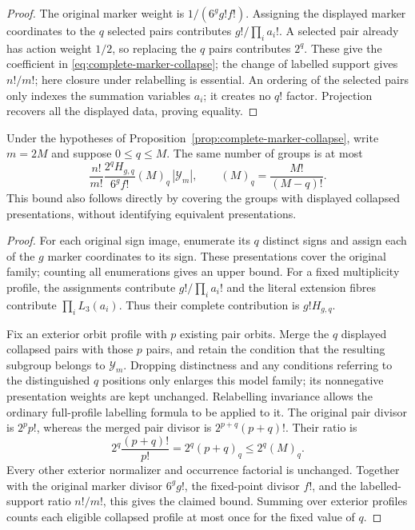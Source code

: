 \begin{proof}
The original marker weight is $1/(6^gg!f!)$. Assigning the displayed
marker coordinates to the $q$ selected pairs contributes
$g!/\prod_i a_i!$. A selected pair already has action weight $1/2$,
so replacing the $q$ pairs contributes $2^q$. These give the
coefficient in \eqref{eq:complete-marker-collapse}; the change of
labelled support gives $n!/m!$; here closure under relabelling is
essential. An ordering of the selected pairs only
indexes the summation variables $a_i$; it creates no $q!$ factor.
Projection recovers all the displayed data, proving equality.
\end{proof}

\begin{proposition}
\label{prop:marker-presentation-bound}
Under the hypotheses of Proposition~\ref{prop:complete-marker-collapse},
write $m=2M$ and suppose $0\leq q\leq M$. The same number of groups is
at most
\[
 \frac{n!}{m!}\frac{2^qH_{g,q}}{6^gf!}(M)_q\,|\mathcal Y_m|,
 \qquad (M)_q=\frac{M!}{(M-q)!}.
\]
This bound also follows directly by covering the groups with displayed
collapsed presentations, without identifying equivalent presentations.
\end{proposition}
\begin{proof}
For each original sign image, enumerate its $q$ distinct signs and assign
each of the $g$ marker coordinates to its sign. These presentations cover
the original family; counting all enumerations gives an upper bound.
For a fixed multiplicity profile, the assignments contribute
$g!/\prod_i a_i!$ and the literal extension fibres contribute
$\prod_iL_3(a_i)$. Thus their complete contribution is $g!H_{g,q}$.

Fix an exterior orbit profile with $p$ existing pair orbits. Merge the
$q$ displayed collapsed pairs with those $p$ pairs, and retain the
condition that the resulting subgroup belongs to $\mathcal Y_m$.
Dropping distinctness and any conditions referring to the distinguished
$q$ positions only enlarges this model family; its nonnegative
presentation weights are kept unchanged. Relabelling invariance
allows the ordinary full-profile labelling formula to be applied to it.
The original pair divisor is $2^pp!$, whereas the merged pair divisor
is $2^{p+q}(p+q)!$. Their ratio is
\[
 2^q\frac{(p+q)!}{p!}=2^q(p+q)_q\leq2^q(M)_q.
\]
Every other exterior normalizer and occurrence factorial is unchanged.
Together with the original marker divisor $6^gg!$, the fixed-point
divisor $f!$, and the labelled-support ratio $n!/m!$, this gives the
claimed bound. Summing over exterior profiles counts each eligible
collapsed profile at most once for the fixed value of $q$.
\end{proof}


